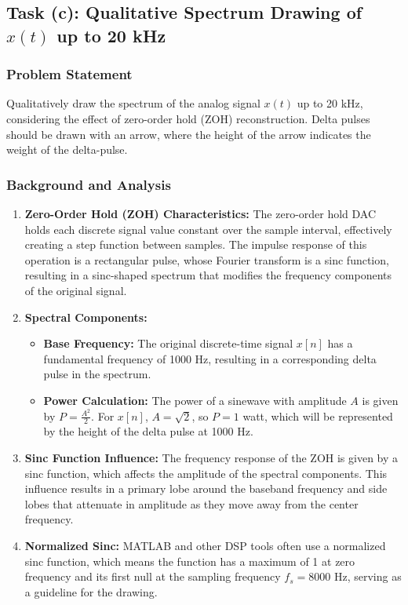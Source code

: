 
\item[(c)]
\subsection{Task (c): Qualitative Spectrum Drawing of $x(t)$ up to 20 kHz}

\subsubsection{Problem Statement}
Qualitatively draw the spectrum of the analog signal $x(t)$ up to 20 kHz, considering the effect of zero-order hold (ZOH) reconstruction. Delta pulses should be drawn with an arrow, where the height of the arrow indicates the weight of the delta-pulse.

\subsubsection{Background and Analysis}
\begin{enumerate}
    \item \textbf{Zero-Order Hold (ZOH) Characteristics:}
    The zero-order hold DAC holds each discrete signal value constant over the sample interval, effectively creating a step function between samples. The impulse response of this operation is a rectangular pulse, whose Fourier transform is a sinc function, resulting in a sinc-shaped spectrum that modifies the frequency components of the original signal.

    \item \textbf{Spectral Components:}
    \begin{itemize}
        \item \textbf{Base Frequency:} The original discrete-time signal $x[n]$ has a fundamental frequency of 1000 Hz, resulting in a corresponding delta pulse in the spectrum.
        \item \textbf{Power Calculation:} The power of a sinewave with amplitude $A$ is given by $P = \frac{A^2}{2}$. For $x[n]$, $A = \sqrt{2}$, so $P = 1$ watt, which will be represented by the height of the delta pulse at 1000 Hz.
    \end{itemize}

    \item \textbf{Sinc Function Influence:}
    The frequency response of the ZOH is given by a sinc function, which affects the amplitude of the spectral components. This influence results in a primary lobe around the baseband frequency and side lobes that attenuate in amplitude as they move away from the center frequency.

    \item \textbf{Normalized Sinc:}
    MATLAB and other DSP tools often use a normalized sinc function, which means the function has a maximum of 1 at zero frequency and its first null at the sampling frequency $f_s = 8000$ Hz, serving as a guideline for the drawing.
\end{enumerate}

